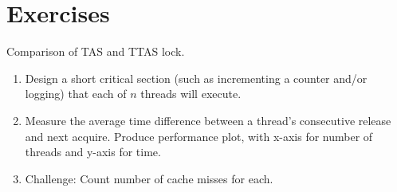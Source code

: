 \section{Exercises}
\begin{exercise}
    Comparison of TAS and TTAS lock.
    \begin{enumerate}
        \item Design a short critical section (such as incrementing a counter and/or logging) that each of $n$ threads will execute.
        \item Measure the average time difference between a thread's consecutive release and next acquire. Produce performance plot, with x-axis for number of threads and y-axis for time.
        \item Challenge: Count number of cache misses for each.
    \end{enumerate}
\end{exercise}

